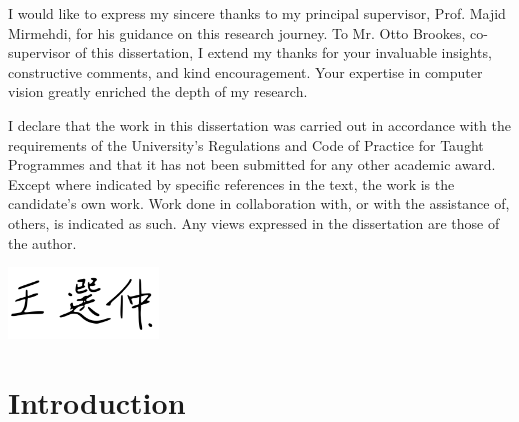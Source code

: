 \documentclass[
]{uob-thesis}
\begin{document}

\begin{acknowledgements}
I would like to express my sincere thanks to my principal supervisor, Prof. Majid Mirmehdi, for his guidance on this research journey. To Mr. Otto Brookes, co-supervisor of this dissertation, I extend my thanks for your invaluable insights, constructive comments, and kind encouragement. Your expertise in computer vision greatly enriched the depth of my research.
\end{acknowledgements}

\begin{declaration}
  I declare that the work in this dissertation was carried out in accordance with the requirements of the University's Regulations and Code of Practice for Taught Programmes and that it has not been submitted for any other academic award. Except where indicated by specific references in the text, the work is the candidate's own work. Work done in collaboration with, or with the assistance of, others, is indicated as such. Any views expressed in the dissertation are those of the author.
  \vspace{2cm}

  \includegraphics[width=4cm]{sig} %
\end{declaration}




\frontmatter

\tableofcontents
\listoftables
\listoffigures



\mainmatter

\chapter{Introduction}
\end{document}
